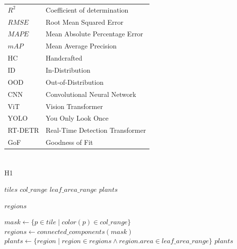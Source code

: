 \documentclass[12pt,a4paper,oneside]{report}
\renewcommand\thesection{2.1.\arabic{section}}
\begin{document}
\noindent 
\begin{tabular}{@{}ll}
$R^2$ & Coefficient of determination\\
$RMSE$ & Root Mean Squared Error\\
$MAPE$ & Mean Absolute Percentage Error\\
$mAP$ & Mean Average Precision\\
HC & Handcrafted\\
ID & In-Distribution\\
OOD & Out-of-Distribution\\
CNN & Convolutional Neural Network\\
ViT & Vision Transformer\\
YOLO & You Only Look Once\\
RT-DETR & Real-Time Detection Transformer\\
GoF & Goodness of Fit\\
\end{tabular}

\section[\appendixname~\thesection]{}
\subsection[\appendixname~\thesubsection]{}
\vspace{-2pt}
\begin{algorithm}[H]
  \caption{H1}
  \label{alg:H1}
  \begin{algorithmic}[1]
  \Require $tiles$ 
  \Require $col\_range$ 
  \Require $leaf\_area\_range$ 
  \Ensure $plants$ 
  
   \cite{wuOptimizingConnectedComponent2005} 
      \State \Return $regions$
  \EndFunction
  
    \State $mask \gets \{p \in tile \mid color(p) \in col\_range\}$
    \State $regions \gets connected\_components(mask)$
    \State $plants \gets \{region \mid region \in regions \land region.area \in leaf\_area\_range\}$
  \EndFor
  \State \Return $plants$
\end{algorithmic}
\end{algorithm}
\end{document}
